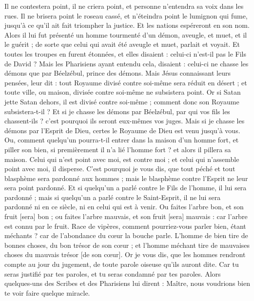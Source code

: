 \begin{multicols}{2}
Il ne contestera point, il ne criera point, et personne n'entendra sa voix dans les rues.
Il ne brisera point le roseau cassé, et n'éteindra point le lumignon qui fume, jusqu'à ce qu'il ait fait triompher la justice.
Et les nations espéreront en son nom.
Alors il lui fut présenté un homme tourmenté d'un démon, aveugle, et muet, et il le guérit ; de sorte que celui qui avait été aveugle et muet, parlait et voyait.
Et toutes les troupes en furent étonnées, et elles disaient : celui-ci n'est-il pas le Fils de David ?
Mais les Pharisiens ayant entendu cela, disaient : celui-ci ne chasse les démons que par Béelzébul, prince des démons.
Mais Jésus connaissant leurs pensées, leur dit : tout Royaume divisé contre soi-même sera réduit en désert ; et toute ville, ou maison, divisée contre soi-même ne subsistera point.
Or si Satan jette Satan dehors, il est divisé contre soi-même ; comment donc son Royaume subsistera-t-il ?
Et si je chasse les démons par Béelzébul, par qui vos fils les chassent-ils ? c'est pourquoi ils seront eux-mêmes vos juges.
Mais si je chasse les démons par l'Esprit de Dieu, certes le Royaume de Dieu est venu jusqu'à vous.
Ou, comment quelqu'un pourra-t-il entrer dans la maison d'un homme fort, et piller son bien, si premièrement il n'a lié l'homme fort ? et alors il pillera sa maison.
Celui qui n'est point avec moi, est contre moi ; et celui qui n'assemble point avec moi, il disperse.
C'est pourquoi je vous dis, que tout péché et tout blasphème sera pardonné aux hommes ; mais le blasphème contre l'Esprit ne leur sera point pardonné.
Et si quelqu'un a parlé contre le Fils de l'homme, il lui sera pardonné ; mais si quelqu'un a parlé contre le Saint-Esprit, il ne lui sera pardonné ni en ce siècle, ni en celui qui est à venir.
Ou faites l'arbre bon, et son fruit [sera] bon ; ou faites l'arbre mauvais, et son fruit [sera] mauvais : car l'arbre est connu par le fruit.
Race de vipères, comment pourriez-vous parler bien, étant méchants ? car de l'abondance du cœur la bouche parle.
L'homme de bien tire de bonnes choses, du bon trésor de son cœur ; et l'homme méchant tire de mauvaises choses du mauvais trésor [de son cœur].
Or je vous dis, que les hommes rendront compte au jour du jugement, de toute parole oiseuse qu'ils auront dite.
Car tu seras justifié par tes paroles, et tu seras condamné par tes paroles.
Alors quelques-uns des Scribes et des Pharisiens lui dirent : Maître, nous voudrions bien te voir faire quelque miracle.

\end{multicols}
